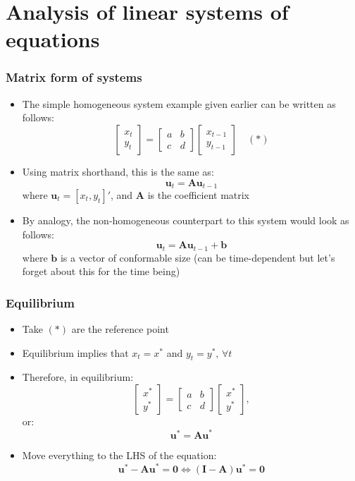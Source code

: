\documentclass[10pt,usenames,dvipsnames]{beamer}
\theoremstyle{definition}
\begin{document}
\section{Analysis of linear systems of equations}
\begin{frame}[fragile]
\frametitle{Matrix form of systems}
\begin{itemize}
	\item The simple homogeneous system example given earlier can be written as follows:
	\[
		\left[\begin{matrix}
			x_{t}\\
			y_{t}
		\end{matrix}\right] = 
		\left[\begin{matrix}
			a & b \\
			c & d
		\end{matrix}\right]
		\left[\begin{matrix}
			x_{t-1}\\
			y_{t-1}
		\end{matrix}\right] \quad (*)
	\]
	\item Using matrix shorthand, this is the same as:
	\[
		\mathbf{u}_{t} = \mathbf{Au}_{t-1}
	\]
	where $\mathbf{u}_{t} = [x_{t},y_{t}]'$, and $\mathbf{A}$ is the coefficient matrix
	\item By analogy, the non-homogeneous counterpart to this system would look as follows:
	\[
		\mathbf{u}_{t} = \mathbf{Au}_{t-1} + \mathbf{b}
	\]
	where $\mathbf{b}$ is a vector of conformable size (can be time-dependent but let's forget about this for the time being)
\end{itemize}
\end{frame}

\begin{frame}[fragile]
\frametitle{Equilibrium}
\begin{itemize}
	\item Take $(*)$ are the reference point
	\item Equilibrium implies that $x_{t} = x^{*}$ and $y_{t} = y^{*},\, \forall t$
	\item Therefore, in equilibrium:
	\[
		\left[\begin{matrix}
			x^{*}\\
			y^{*}
		\end{matrix}\right] = 
		\left[\begin{matrix}
			a & b \\
			c & d
		\end{matrix}\right]
		\left[\begin{matrix}
			x^{*}\\
			y^{*}
		\end{matrix}\right],
	\]
	or:
	\[
		\mathbf{u}^{*} = \mathbf{Au}^{*}
	\]
	\item Move everything to the LHS of the equation:
	\[
		\mathbf{u}^{*} - \mathbf{Au}^{*} = \mathbf{0} \Leftrightarrow ( \mathbf{I-A})\mathbf{u}^{*} = \mathbf{0}
	\]
\end{itemize}
\end{frame}
\end{document}
